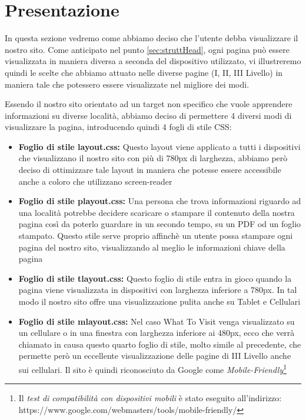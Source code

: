 \section{Presentazione}\label{sec:presentazione}
In questa sezione vedremo come abbiamo deciso che l'utente debba visualizzare il nostro sito.
Come anticipato nel punto \ref{sec:struttHead}, ogni pagina può essere visualizzata in maniera diversa a seconda del dispositivo utilizzato, vi illustreremo quindi le scelte che abbiamo attuato nelle diverse pagine (I, II, III Livello) in maniera tale che potessero essere visualizzate nel migliore dei modi.

Essendo il nostro sito orientato ad un target non specifico che vuole apprendere informazioni su diverse località, abbiamo deciso di permettere 4 diversi modi di visualizzare la pagina, introducendo quindi 4 fogli di stile CSS:
\begin{itemize}
\item \textbf{Foglio di stile layout.css:} Questo layout viene applicato a tutti i dispositivi che visualizzano il nostro sito con più di 780px di larghezza, abbiamo però deciso di ottimizzare tale layout in maniera che potesse essere accessibile anche a coloro che utilizzano screen-reader
\item \textbf{Foglio di stile playout.css:} Una persona che trova informazioni riguardo ad una località potrebbe decidere scaricare o stampare il contenuto della nostra pagina così da poterlo guardare in un secondo tempo, su un PDF od un foglio stampato. Questo stile serve proprio affinchè un utente possa stampare ogni pagina del nostro sito, visualizzando al meglio le informazioni chiave della pagina
\item \textbf{Foglio di stile tlayout.css:} Questo foglio di stile entra in gioco quando la pagina viene visualizzata in dispositivi con larghezza inferiore a 780px. In tal modo il nostro sito offre una visualizzazione pulita anche su Tablet e Cellulari
\item \textbf{Foglio di stile mlayout.css:} Nel caso What To Visit venga visualizzato su un cellulare o in una finestra con larghezza inferiore ai 480px, ecco che verrà chiamato in causa questo quarto foglio di stile, molto simile al precedente, che permette però un eccellente visualizzazione delle pagine di III Livello anche sui cellulari. Il sito è quindi riconosciuto da Google come \textit{Mobile-Friendly}\footnote{Il \textit{test di compatibilità con dispositivi mobili} è stato eseguito all'indirizzo: https://www.google.com/webmasters/tools/mobile-friendly/}
\end{itemize}

